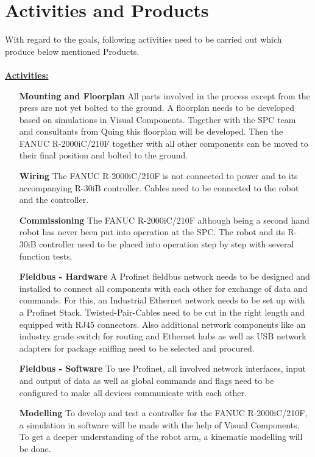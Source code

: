 
\chapter{Activities and Products}

With regard to the goals, following activities need to be carried out which produce below mentioned Products.\\
\\
\underline{\textbf{Activities:}}\vspace{2mm}
\begin{itemize}[leftmargin=5cm]
	\item[\textbf{Mounting and Floorplan}] All parts involved in the process except from the press are not yet bolted to the ground. A floorplan needs to be developed based on simulations in Visual Components. Together with the SPC team and consultants from Quing this floorplan will be developed. Then the FANUC R-2000iC/210F together with all other components can be moved to their final position and bolted to the ground.
	\item[\textbf{Wiring}] The FANUC R-2000iC/210F is not connected to power and to its accompanying R-30iB controller. Cables need to be connected to the robot and the controller.
	\item[\textbf{Commissioning}] The FANUC R-2000iC/210F although being a second hand robot has never been put into operation at the SPC. The robot and its R-30iB controller need to  be placed into operation step by step with several function tests.
	\item[\textbf{Fieldbus - Hardware}] A Profinet fieldbus network needs to be designed and installed to connect all components with each other for exchange of data and commands. For this, an Industrial Ethernet network needs to be set up with a Profinet Stack. Twisted-Pair-Cables need to be cut in the right length and equipped with RJ45 connectors. Also additional network components like an industry grade switch for routing and Ethernet hubs as well as USB network adapters for package sniffing need  to be selected and procured. 
	\item[\textbf{Fieldbus - Software}] To use Profinet, all involved network interfaces, input and output of data as well as global commands and flags need to be configured to make all devices communicate with each other.   
	\item[\textbf{Modelling}] To develop and test a controller for the FANUC R-2000iC/210F, a simulation in software will be made with the help of Visual Components. To get a deeper understanding of the robot arm, a kinematic modelling will be done.

\end{itemize}
